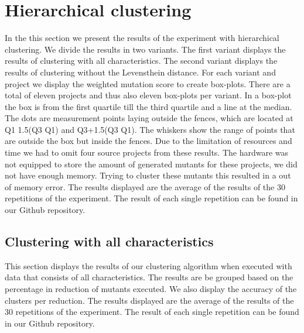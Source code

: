 \documentclass[../../main]{subfiles}
\begin{document}
\section{Hierarchical clustering}
\label{ch:results_rq1}
In the this section we present the results of the experiment with hierarchical clustering.
We divide the results in two variants. 
The first variant displays the results of clustering with all characteristics.
The second variant displays the results of clustering without the Levensthein distance.
\newline
For each variant and project we display the weighted mutation score to create box-plots.
There are a total of eleven projects and thus also eleven box-plots per variant.
In a box-plot the box is from the first quartile till the third quartile and a line at the median. 
The dots are measurement points laying outside the fences, which are located at Q1  1.5(Q3  Q1) and Q3+1.5(Q3  Q1). 
The whiskers show the range of points that are outside the box but inside the fences.
\newline
Due to the limitation of resources and time we had to omit four source projects from these results. 
The hardware was not equipped to store the amount of generated mutants for these projects, we did not have enough memory.
Trying to cluster these mutants this resulted in a out of memory error.
\newline
The results displayed are the average of the results of the 30 repetitions of the experiment.
The result of each single repetition can be found in our Github repository\cite{rbasarat-repo}.

\subsection{Clustering with all characteristics}
This section displays the results of our clustering algorithm when executed with data that consists of all characteristics.
The results are be grouped based on the percentage in reduction of mutants executed.
We also display the accuracy of the clusters per reduction.
The results displayed are the average of the results of the 30 repetitions of the experiment.
The result of each single repetition can be found in our Github repository\cite{rbasarat-repo}.
\end{document}
